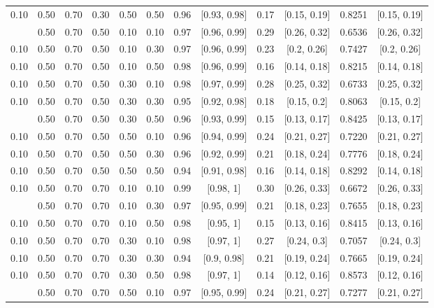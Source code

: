 \documentclass[
  11pt,
]{article}
\begin{document}
\begin{landscape}
\begin{ThreePartTable}
\begin{longtable}[t]{cccccccccccc}
0.10 & 0.50 & 0.70 & 0.30 & 0.50 & 0.50 & 0.96 & {}[0.93, 0.98] & 0.17 & {}[0.15, 0.19] & 0.8251 & {}[0.15, 0.19]\\
\addlinespace
0.10 & 0.50 & 0.70 & 0.50 & 0.10 & 0.10 & 0.97 & {}[0.96, 0.99] & 0.29 & {}[0.26, 0.32] & 0.6536 & {}[0.26, 0.32]\\
0.10 & 0.50 & 0.70 & 0.50 & 0.10 & 0.30 & 0.97 & {}[0.96, 0.99] & 0.23 & {}[0.2, 0.26] & 0.7427 & {}[0.2, 0.26]\\
0.10 & 0.50 & 0.70 & 0.50 & 0.10 & 0.50 & 0.98 & {}[0.96, 0.99] & 0.16 & {}[0.14, 0.18] & 0.8215 & {}[0.14, 0.18]\\
0.10 & 0.50 & 0.70 & 0.50 & 0.30 & 0.10 & 0.98 & {}[0.97, 0.99] & 0.28 & {}[0.25, 0.32] & 0.6733 & {}[0.25, 0.32]\\
0.10 & 0.50 & 0.70 & 0.50 & 0.30 & 0.30 & 0.95 & {}[0.92, 0.98] & 0.18 & {}[0.15, 0.2] & 0.8063 & {}[0.15, 0.2]\\
\addlinespace
0.10 & 0.50 & 0.70 & 0.50 & 0.30 & 0.50 & 0.96 & {}[0.93, 0.99] & 0.15 & {}[0.13, 0.17] & 0.8425 & {}[0.13, 0.17]\\
0.10 & 0.50 & 0.70 & 0.50 & 0.50 & 0.10 & 0.96 & {}[0.94, 0.99] & 0.24 & {}[0.21, 0.27] & 0.7220 & {}[0.21, 0.27]\\
0.10 & 0.50 & 0.70 & 0.50 & 0.50 & 0.30 & 0.96 & {}[0.92, 0.99] & 0.21 & {}[0.18, 0.24] & 0.7776 & {}[0.18, 0.24]\\
0.10 & 0.50 & 0.70 & 0.50 & 0.50 & 0.50 & 0.94 & {}[0.91, 0.98] & 0.16 & {}[0.14, 0.18] & 0.8292 & {}[0.14, 0.18]\\
0.10 & 0.50 & 0.70 & 0.70 & 0.10 & 0.10 & 0.99 & {}[0.98, 1] & 0.30 & {}[0.26, 0.33] & 0.6672 & {}[0.26, 0.33]\\
\addlinespace
0.10 & 0.50 & 0.70 & 0.70 & 0.10 & 0.30 & 0.97 & {}[0.95, 0.99] & 0.21 & {}[0.18, 0.23] & 0.7655 & {}[0.18, 0.23]\\
0.10 & 0.50 & 0.70 & 0.70 & 0.10 & 0.50 & 0.98 & {}[0.95, 1] & 0.15 & {}[0.13, 0.16] & 0.8415 & {}[0.13, 0.16]\\
0.10 & 0.50 & 0.70 & 0.70 & 0.30 & 0.10 & 0.98 & {}[0.97, 1] & 0.27 & {}[0.24, 0.3] & 0.7057 & {}[0.24, 0.3]\\
0.10 & 0.50 & 0.70 & 0.70 & 0.30 & 0.30 & 0.94 & {}[0.9, 0.98] & 0.21 & {}[0.19, 0.24] & 0.7665 & {}[0.19, 0.24]\\
0.10 & 0.50 & 0.70 & 0.70 & 0.30 & 0.50 & 0.98 & {}[0.97, 1] & 0.14 & {}[0.12, 0.16] & 0.8573 & {}[0.12, 0.16]\\
\addlinespace
0.10 & 0.50 & 0.70 & 0.70 & 0.50 & 0.10 & 0.97 & {}[0.95, 0.99] & 0.24 & {}[0.21, 0.27] & 0.7277 & {}[0.21, 0.27]\\

\end{longtable}
\end{ThreePartTable}
\end{landscape}
\end{document}
